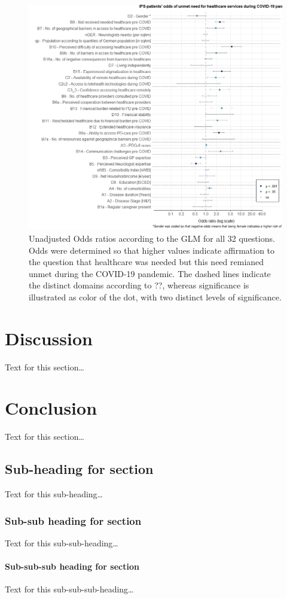 \documentclass{bmcart}
\begin{document}
\begin{figure}
\centering
\includegraphics[width=.90\textwidth]{fig3.oddsratios.v1.0.jpeg}
\caption{Unadjusted Odds ratios according to the \textsc{GLM} for all 32 questions. Odds were determined so that higher values indicate affirmation to the question that healthcare was needed but this need remianed unmet during the COVID-19 pandemic. The dashed lines indicate the distinct domains according to ??, whereas significance is illustrated as color of the dot, with two distinct levels of significance. }%
\label{fig3:resultsOR1}
\end{figure}


	\section*{Discussion}
	Text for this section\ldots
	\section*{Conclusion}
	Text for this section\ldots
	\subsection*{Sub-heading for section}
	Text for this sub-heading\ldots
	\subsubsection*{Sub-sub heading for section}
	Text for this sub-sub-heading\ldots
	\paragraph*{Sub-sub-sub heading for section}
	Text for this sub-sub-sub-heading\ldots
	
\end{document}
